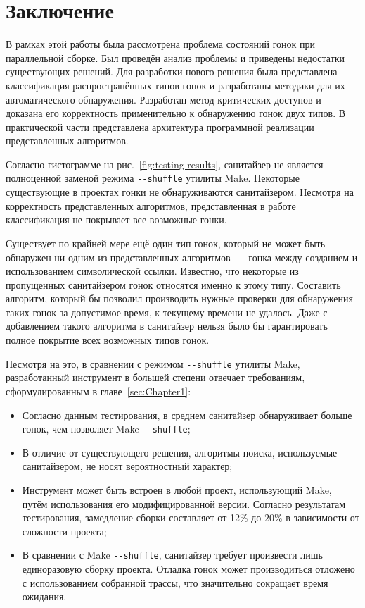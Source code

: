 \section{Заключение}
\label{sec:Chapter5} 


В рамках этой работы была рассмотрена проблема состояний гонок при параллельной сборке. Был проведён анализ проблемы и приведены недостатки существующих решений. Для разработки нового решения была представлена классификация распространённых типов гонок и разработаны методики для их автоматического обнаружения. Разработан метод критических доступов и доказана его корректность применительно к обнаружению гонок двух типов. В практической части представлена архитектура программной реализации представленных алгоритмов.

Согласно гистограмме на рис.~\ref{fig:testing-results}, санитайзер не является полноценной заменой режима \texttt{-{}-shuffle} утилиты Make. Некоторые существующие в проектах гонки не обнаруживаются санитайзером. Несмотря на корректность представленных алгоритмов, представленная в работе классификация не покрывает все возможные гонки.

Существует по крайней мере ещё один тип гонок, который не может быть обнаружен ни одним из представленных алгоритмов~--- гонка между созданием и использованием символической ссылки. Известно, что некоторые из пропущенных санитайзером гонок относятся именно к этому типу. Составить алгоритм, который бы позволил производить нужные проверки для обнаружения таких гонок за допустимое время, к текущему времени не удалось. Даже с добавлением такого алгоритма в санитайзер нельзя было бы гарантировать полное покрытие всех возможных типов гонок.

Несмотря на это, в сравнении с режимом \texttt{-{}-shuffle} утилиты Make, разработанный инструмент в большей степени отвечает требованиям, сформулированным в главе~\ref{sec:Chapter1}:

\begin{itemize}
    \item Согласно данным тестирования, в среднем санитайзер обнаруживает больше гонок, чем позволяет Make \texttt{-{}-shuffle};
    \item В отличие от существующего решения, алгоритмы поиска, используемые санитайзером, не носят вероятностный характер;
    \item Инструмент может быть встроен в любой проект, использующий Make, путём использования его модифицированной версии. Согласно результатам тестирования, замедление сборки составляет от 12\% до 20\% в зависимости от сложности проекта;
    \item В сравнении с Make \texttt{-{}-shuffle}, санитайзер требует произвести лишь единоразовую сборку проекта. Отладка гонок может производиться отложено с использованием собранной трассы, что значительно сокращает время ожидания.
\end{itemize}

